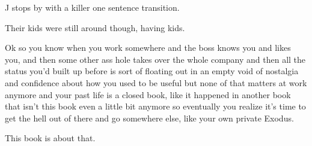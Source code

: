 {
}
{
}
{
	J stops by with a killer one sentence transition.

}

{
}
{
}
{
	Their kids were still around though, having kids.
}

{
}
{
}
{
	Ok so you know when you work somewhere and the boss knows
	you and likes you, and then some other ass%
	hole 
	takes over
	the whole company and then all the status you'd built up before
	is sort
	of floating out in an empty void of nostalgia and confidence
	about how
	you used to be useful but none of that matters at work anymore
	and your past life is a closed book, like it happened in another
	book that isn't this book even a little bit anymore so
	eventually
	you realize it's time to get the hell out of there and go
	somewhere else,
	like your own private Exodus.
	
	This book is about that.

}


